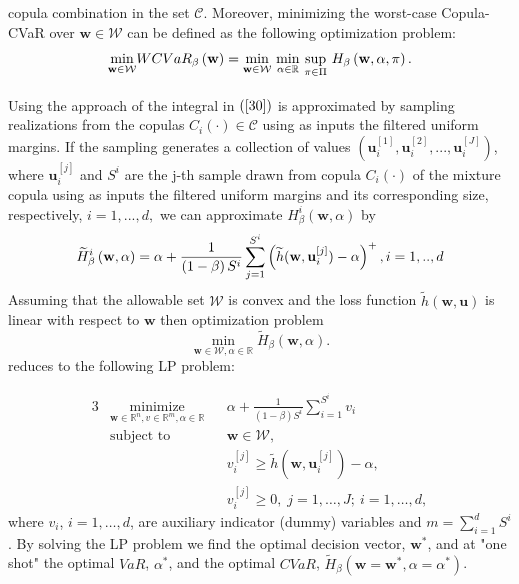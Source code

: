 \documentclass[a4paper,10pt]{article}
\begin{document}
copula combination in the set $\mathcal{C}$. Moreover, minimizing the
worst-case Copula-CVaR over $\mathbf{w}\in \mathcal{W}$ can be defined as
the following optimization problem:%
\begin{equation}
\underset{\mathbf{w}\in \mathcal{W}}{\min }WCVaR_{\beta }\left( \mathbf{w}%
\right) =\underset{}{\underset{\mathbf{w}\in \mathcal{W}}{\min }~\underset{%
		\alpha \in
		\mathbb{R}
	}{\min }~\underset{\pi \in \Pi }{\sup }}~H_{\beta }\left( \mathbf{w},\alpha
,\pi \right) .  \label{32}
\end{equation}%
Using the approach of \citet*{rockafellar2000} the integral in $\left( \ref%
{30}\right) $ is approximated by sampling realizations from the copulas $%
C_{i}\left( \cdot \right) \in \mathcal{C}$ using as inputs the filtered
uniform margins. If the sampling generates a collection of values $\left(
\mathbf{u}_{i}^{[1]},\mathbf{u}_{i}^{[2]},...,\mathbf{u}_{i}^{[J]}\right) $,
where $\mathbf{u}_{i}^{[j]}$ and $S^{i}$ are the j-th sample drawn from
copula $C_{i}\left( \cdot \right) $ of the mixture copula using as inputs
the filtered uniform margins and its corresponding size, respectively, $%
i=1,...,d,$ we can approximate $H_{\beta }^{i}\left( \mathbf{w},\alpha
\right) $ by
\begin{equation}
\widetilde{H}_{\beta }^{i}\left( \mathbf{w},\alpha \right) =\alpha +\frac{1}{%
	\left( 1-\beta \right) S^{i}}\sum_{j=1}^{S^{i}}\left( \widetilde{h}(\mathbf{w},\mathbf{u}%
_{i}^{[j]})-\alpha \right) ^{+},i=1,..,d
\end{equation}%
Assuming that the allowable set $\mathcal{W}$ is convex and the loss
function $\widetilde{h}\left( \mathbf{w,u}\right) $ is linear with respect to $\mathbf{w}
$ then optimization problem
\begin{equation}
\underset{\mathbf{w}\in \mathcal{W},\alpha \in
	\mathbb{R}
}{\min }\widetilde{H}_{\beta }\left( \mathbf{w},\alpha \right) .
\end{equation}%
reduces to the following LP problem:

\begin{alignat}{3}
& \underset{\mathbf{w}\in
	\mathbb{R}^{n},v\in
	\mathbb{R}^{m},\alpha \in
	\mathbb{R}}{\text{minimize}}
& & \alpha +\frac{1}{\left( 1-\beta \right)  S^{i}}\sum_{i=1}^{S^{i}}v_{i}
\\ 
& \text{subject to} 
& & \mathbf{w}\in \mathcal{W},\\
&&& v_{i}^{\left[ j\right] }\geq \widetilde{h}(\mathbf{w},\mathbf{u}_{i}^{[j]})-\alpha , \\
&&&v_{i}^{\left[ j\right] }\geq 0, \; j = 1, \ldots, J; \ i = 1, \ldots, d,
\end{alignat}
where $v_{i}$, $i = 1, \ldots, d$, are auxiliary indicator (dummy) variables and $%
m=\sum_{i=1}^{d}S^{i}$. By solving the LP problem we find the optimal
decision vector, $\mathbf{w}^{\ast }$, and at "one shot" the optimal $VaR$, $%
\alpha ^{\ast }$, and the optimal $CVaR$, $\widetilde{H}_{\beta }\left(
\mathbf{w}=\mathbf{w}^{\ast },\alpha =\alpha ^{\ast }\right) $.
\end{document}
